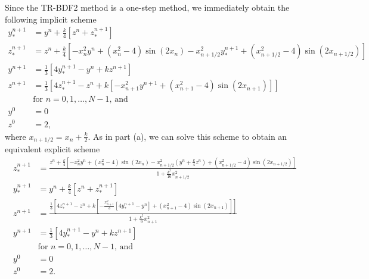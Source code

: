\documentclass{homework}
\begin{document}
\begin{alphaparts}
		\questionpart Since the TR-BDF2 method is a one-step method, we immediately obtain the following implicit scheme
		\begin{align*}
			y_*^{n+1} &= y^n + \frac{k}{4}\left[z^n + z_*^{n+1}\right] \\
			z_*^{n+1} &= z^n + \frac{k}{4}\left[-x_n^2y^n + (x_n^2 - 4)\sin(2x_n) - x_{n+1/2}^2y_*^{n+1} + (x_{n+1/2}^2-4)\sin(2x_{n+1/2})\right] \\
			y^{n+1} &= \frac{1}{3}\left[4y_*^{n+1} - y^n + kz^{n+1}\right] \\
			z^{n+1} &= \frac{1}{3}\left[4z_*^{n+1} - z^n + k\left[-x_{n+1}^2y^{n+1} + (x_{n+1}^2 - 4)\sin(2x_{n+1})\right]\right] \\
			&\text{for $n = 0, 1, \dots, N-1$, and} \\
			y^0 &= 0 \\
			z^0 &= 2,
		\end{align*}
		where $x_{n+1/2} = x_n + \frac{k}{2}$. As in part (a), we can solve this scheme to obtain an equivalent explicit scheme
		\begin{align*}
			z_*^{n+1} &= \frac{z^n + \frac{k}{4}\left[-x_n^2y^n + (x_n^2-4)\sin(2x_n) -x_{n+1/2}^2\left(y^n + \frac{k}{4}z^n\right) + (x_{n+1/2}^2-4)\sin(2x_{n+1/2})\right]}{1 + \frac{k^2}{16}x_{n+1/2}^2} \\
			y_*^{n+1} &= y^n + \frac{k}{4}\left[z^n + z_*^{n+1}\right] \\
			z^{n+1} &= \frac{\frac{1}{3}\left[4z_*^{n+1} - z^n + k\left[-\frac{x_{n+1}^2}{3}\left[4y_*^{n+1} - y^n\right] + (x_{n+1}^2 -4)\sin(2x_{n+1})\right]\right]}{1+\frac{k^2}{9}x_{n+1}^2} \\
			y^{n+1} &= \frac{1}{3}\left[4y_*^{n+1} - y^n + kz^{n+1}\right]\\
			&\text{for $n = 0,1,\dots,N-1$, and} \\
			y^0 &= 0 \\
			z^0 &= 2.
		\end{align*}
		
		\questionpart 

	\end{alphaparts}
	
\end{document}

